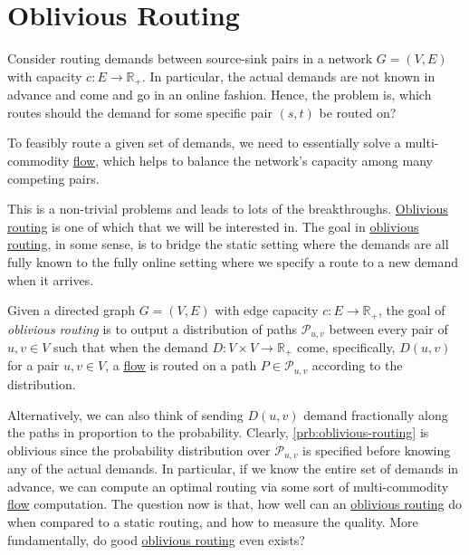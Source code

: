 \section{Oblivious Routing}
Consider routing demands between source-sink pairs in a network \(G = (V, E)\) with capacity \(c \colon E\to \mathbb{R} _{+}\). In particular, the actual demands are not known in advance and come and go in an online fashion. Hence, the problem is, which routes should the demand for some specific pair \((s, t)\) be routed on?

\begin{intuition}
	To feasibly route a given set of demands, we need to essentially solve a multi-commodity \hyperref[def:flow]{flow}, which helps to balance the network's capacity among many competing pairs.
\end{intuition}

This is a non-trivial problems and leads to lots of the breakthroughs. \hyperref[prb:oblivious-routing]{Oblivious routing} is one of which that we will be interested in. The goal in \hyperref[prb:oblivious-routing]{oblivious routing}, in some sense, is to bridge the static setting where the demands are all fully known to the fully online setting where we specify a route to a new demand when it arrives.

\begin{problem}\label{prb:oblivious-routing}
Given a directed graph \(G = (V, E)\) with edge capacity \(c \colon E \to \mathbb{R} _{+}\), the goal of \emph{oblivious routing} is to output a distribution of paths \(\mathcal{P} _{u, v}\)  between every pair of \(u, v \in V\) such that when the demand \(D \colon V \times V \to \mathbb{R} _{+}\) come, specifically, \(D(u, v)\) for a pair \(u, v \in V\), a \hyperref[def:flow]{flow} is routed on a path \(P \in \mathcal{P} _{u, v}\) according to the distribution.
\end{problem}

Alternatively, we can also think of sending \(D(u, v)\) demand fractionally along the paths in proportion to the probability. Clearly, \autoref{prb:oblivious-routing} is oblivious since the probability distribution over \(\mathcal{P} _{u, v}\) is specified before knowing any of the actual demands. In particular, if we know the entire set of demands in advance, we can compute an optimal routing via some sort of multi-commodity \hyperref[def:flow]{flow} computation. The question now is that, how well can an \hyperref[prb:oblivious-routing]{oblivious routing} do when compared to a static routing, and how to measure the quality. More fundamentally, do good \hyperref[prb:oblivious-routing]{oblivious routing} even exists?

